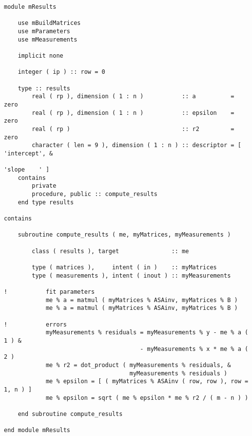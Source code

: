 \begin{lstlisting}
module mResults

    use mBuildMatrices
    use mParameters
    use mMeasurements

    implicit none

    integer ( ip ) :: row = 0

    type :: results
        real ( rp ), dimension ( 1 : n )           :: a          = zero
        real ( rp ), dimension ( 1 : n )           :: epsilon    = zero
        real ( rp )                                :: r2         = zero
        character ( len = 9 ), dimension ( 1 : n ) :: descriptor = [ 'intercept', &
                                                                     'slope    ' ]
    contains
        private
        procedure, public :: compute_results
    end type results

contains

    subroutine compute_results ( me, myMatrices, myMeasurements )

        class ( results ), target               :: me

        type ( matrices ),     intent ( in )    :: myMatrices
        type ( measurements ), intent ( inout ) :: myMeasurements

!           fit parameters
            me % a = matmul ( myMatrices % ASAinv, myMatrices % B )
            me % a = matmul ( myMatrices % ASAinv, myMatrices % B )

!           errors
            myMeasurements % residuals = myMeasurements % y - me % a ( 1 ) &
                                       - myMeasurements % x * me % a ( 2 )
            me % r2 = dot_product ( myMeasurements % residuals, &
                                    myMeasurements % residuals )
            me % epsilon = [ ( myMatrices % ASAinv ( row, row ), row = 1, n ) ]
            me % epsilon = sqrt ( me % epsilon * me % r2 / ( m - n ) )

    end subroutine compute_results

end module mResults
\end{lstlisting}


